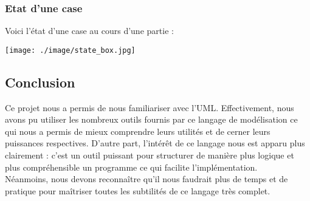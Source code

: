 \documentclass[12pt , a4paper]{article}
\begin{document}
	\subsubsection{Etat d'une case}	
	\noindent Voici l'état d'une case au cours d'une partie :
		\begin{center}
	  \texttt{[image: ./image/state\_box.jpg]}
	\end{center}
\newpage	
\subsection{Conclusion}
\noindent Ce projet nous a permis de nous familiariser avec l'UML. Effectivement, nous avons pu utiliser les nombreux outils fournis par ce langage de modélisation ce qui nous a permis de mieux comprendre leurs utilités et de cerner leurs puissances respectives. D'autre part, l'intér\^et de ce langage nous est apparu plus clairement : c'est un outil puissant pour structurer de manière plus logique et plus compréhensible un programme ce qui facilite l'implémentation.\\
Néanmoins, nous devons reconna\^itre qu'il nous faudrait plus de temps et de pratique pour ma\^itriser toutes les subtilités de ce langage très complet.
\end{document}
